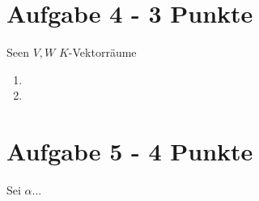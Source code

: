 \documentclass[a4paper]{article}
\begin{document}
\section*{Aufgabe 4 - 3 Punkte}
Seen $V,W$ $K$-Vektorräume

  \begin{enumerate}[label=(\alph*)]
  \item 
  \item 
  
  \end{enumerate}
 
 \section*{Aufgabe 5 - 4 Punkte}
Sei $\alpha$...
\end{document}
